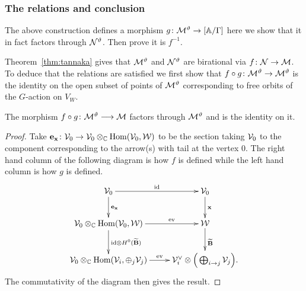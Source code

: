 \documentclass{amsart}
\theoremstyle{definition}
\newcommand\VW{V_W}
\begin{document}

\subsubsection{The relations and conclusion}

The above construction defines a morphism $g \colon \mathcal{M}^\vartheta \rightarrow [\mathbb{A}/\Gamma]$ here we show that it in fact factors through $\mathcal{N}^\vartheta$.
Then prove it is $f^{-1}$.

Theorem~\ref{thm:tannaka} gives that $\mathcal{M}^\vartheta$ and $\mathcal{N}^\vartheta$ are birational via $f \colon \mathcal{N} \rightarrow \mathcal{M}$.
To deduce that the relations are satisfied we first show that $f \circ g \colon \mathcal{M}^\vartheta \rightarrow \mathcal{M}^\vartheta$ is the identity on the open subset of points of $\mathcal{M}^\vartheta$ corresponding to free orbits of the $G$-action on $\VW$.

\begin{theorem}\label{thm:fg}
The morphism $f \circ g \colon \mathcal{M}^{\vartheta} \longrightarrow \mathcal{M}$ factors through $\mathcal{M}^\vartheta$ and is the identity on it.
\end{theorem}

\begin{proof}
Take $\mathbf{e}_{\mathbf{x}} \colon \mathcal{V}_0 \rightarrow \mathcal{V}_0 \otimes_{\mathbb{C}} \operatorname{Hom}(\mathcal{V}_0, \mathcal{W})$ to be the section taking $\mathcal{V}_0$ to the component corresponding to the arrow(s) with tail at the vertex $0$.
The right hand column of the following diagram is how $f$ is defined while the left hand column is how $g$ is defined.
\begin{equation}\label{eq:gf}
    \xymatrix{\cV_0 \ar[r]^{\text{id}} \ar[d]^{\bfe_\bfx} & \cV_0 \ar[d]^\bfx \\
    \cV_0 \otimes_\bC \Hom(\cV_0, \cW) \ar[r]^-{\text{ev}} \ar[d]^{\text{id} \otimes H^0({\widetilde{\bfB}})} & \cW \ar[d]^{\widetilde{\bfB}} \\
    \cV_0 \otimes_\bC \Hom(\cV_i, \oplus_j \cV_j) \ar[r]^-{\text{ev}} & \cV_i^\vee \otimes \Big(\bigoplus_{i \rightarrow j}\cV_j\Big).
    }
\end{equation}
The commutativity of the diagram then gives the result.
\end{proof}
\end{document}
